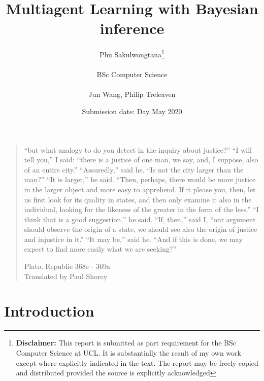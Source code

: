 \documentclass{report}
\title{{{\Huge Multiagent Learning with Bayesian inference}}\\
}
\date{Submission date: Day May 2020}
\author{Phu Sakulwongtana\thanks{
{\bf Disclaimer:}
This report is submitted as part requirement for the BSc Computer Science at UCL. It is
substantially the result of my own work except where explicitly indicated in the text.
The report may be freely copied and distributed provided the source is explicitly acknowledged
}
\\ \\
BSc Computer Science\\ \\
Jun Wang, Philip Treleaven}
\newcommand{\correctquote}[1]{``#1''}
\newenvironment{outline} {\renewcommand\abstractname{}\begin{abstract}} {\end{abstract}}
\begin{document}
 
\onehalfspacing
\maketitle

\begin{abstract}

\end{abstract}

\clearpage
\vspace*{\fill}
\thispagestyle{empty} %
\begin{quotation}
\correctquote{but what analogy to do you detect in the inquiry about justice?} \correctquote{I will tell you,} I said: \correctquote{there is a justice of one man, we say, and, I suppose, also of an entire city.} \correctquote{Assuredly,} said he. \correctquote{Is not the city larger than the man?} \correctquote{It is larger,} he said. \correctquote{Then, perhaps, there would be more justice in the larger object and more easy to apprehend. If it please you, then, let us first look for its quality in states, and then only examine it also in the individual, looking for the likeness of the greater in the form of the less.} \correctquote{I think that is a good suggestion,} he said. \correctquote{If, then,} said I, \correctquote{our argument should observe the origin of a state, we should see also the origin of justice and injustice in it.} \correctquote{It may be,} said he. \correctquote{And if this is done, we may expect to find more easily what we are seeking?}

\medskip
\raggedleft
Plato, Republic 368e - 369a \\
Translated by Paul Shorey \cite{gregory_crane}
\end{quotation}
\vspace*{\fill}

\setcounter{tocdepth}{1}
\tableofcontents

% 

\setcounter{page}{1}


\chapter{Introduction}

\end{document}

